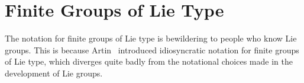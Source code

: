 \section{Finite Groups of Lie Type}

\begin{ddanger}
The notation for finite groups of Lie type is bewildering to people who
know Lie groups. This is because Artin~\cite{artin1955order} introduced
idiosyncratic notation for finite groups of Lie type, which diverges
quite badly from the notational choices made in the development of Lie
groups. 
\end{ddanger}
